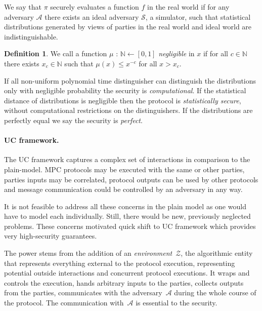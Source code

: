 \documentclass[
  digital, %
  twoside, %
  table,   %
  lof,     %
  lot,     %
]{fithesis3}
\theoremstyle{definition}
\newtheorem{definition}{Definition}
\theoremstyle{remark}
\begin{document}
We say that $\pi$ securely evaluates a function $f$ in the real world if for any adversary $\mathcal{A}$ there exists an ideal adversary $\mathcal{S}$, a simulator, such that statistical distributions generated by views of parties in the real world and ideal world are indistinguishable. 

\begin{definition}
	We call a function $\mu$ : $\mathbb{N} \leftarrow [0,1]$ \emph{negligible} in $x$ if for all $c \in \mathbb{N}$ there exists $x_c \in \mathbb{N}$ such that $\mu(x) \leq x^{-c}$ for all $x > x_c$.
\end{definition}

If all non-uniform polynomial time distinguisher can distinguish the distributions only with negligible probability the security is \emph{computational}. If the statistical distance of distributions is negligible then the protocol is \emph{statistically secure}, without computational restrictions on the distinguishers.
If the distributions are perfectly equal we say the security is \emph{perfect}. 


\paragraph{UC framework.}
The UC framework captures a complex set of interactions in comparison to the plain-model. MPC protocols may be executed with the same or other parties, parties inputs may be correlated, protocol outputs can be used by other protocols and message communication could be controlled by an adversary in any way. 

It is not feasible to address all these concerns in the plain model as one would have to model each individually. Still, there would be new, previously neglected problems. These concerns motivated quick shift to UC framework which provides very high-security guarantees.

The power stems from the addition of an \emph{environment}~$\mathcal{Z}$, the algorithmic entity that represents everything external to the protocol execution, representing potential outside interactions and concurrent protocol executions. It wraps and controls the execution, hands arbitrary inputs to the parties, collects outputs from the parties, communicates with the adversary~$\mathcal{A}$ during the whole course of the protocol. The communication with~$\mathcal{A}$ is essential to the security.
\end{document}
